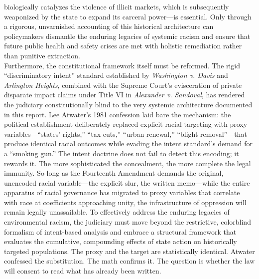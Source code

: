 \documentclass[
]{article}
\newcounter{none} %
\begin{document}
biologically catalyzes the violence of illicit markets, which is
subsequently weaponized by the state to expand its carceral power---is
essential. Only through a rigorous, unvarnished accounting of this
historical architecture can policymakers dismantle the enduring legacies
of systemic racism and ensure that future public health and safety
crises are met with holistic remediation rather than punitive
extraction.\\
Furthermore, the constitutional framework itself must be reformed. The
rigid ``discriminatory intent'' standard established by \emph{Washington
v. Davis} and \emph{Arlington Heights}, combined with the Supreme
Court's evisceration of private disparate impact claims under Title VI
in \emph{Alexander v. Sandoval}, has rendered the judiciary
constitutionally blind to the very systemic architecture documented in
this report. Lee Atwater's 1981 confession laid bare the mechanism: the
political establishment deliberately replaced explicit racial targeting
with proxy variables---``states' rights,'' ``tax cuts,'' ``urban
renewal,'' ``blight removal''---that produce identical racial outcomes
while evading the intent standard's demand for a ``smoking gun.'' The
intent doctrine does not fail to detect this encoding; it rewards it.
The more sophisticated the concealment, the more complete the legal
immunity. So long as the Fourteenth Amendment demands the original,
unencoded racial variable---the explicit slur, the written memo---while
the entire apparatus of racial governance has migrated to proxy
variables that correlate with race at coefficients approaching unity,
the infrastructure of oppression will remain legally unassailable. To
effectively address the enduring legacies of environmental racism, the
judiciary must move beyond the restrictive, colorblind formalism of
intent-based analysis and embrace a structural framework that evaluates
the cumulative, compounding effects of state action on historically
targeted populations. The proxy and the target are statistically
identical. Atwater confessed the substitution. The math confirms it. The
question is whether the law will consent to read what has already been
written.

\nocite{*}
\newrefcontext[sorting=none]
\printbibliography[title={Works cited}]
\label{works-cited}
\end{document}
